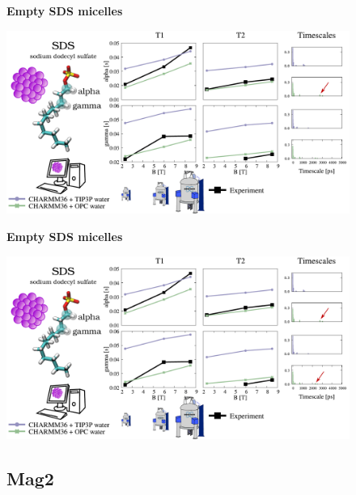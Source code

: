 \documentclass{beamer}
\begin{document}
\addtocounter{framenumber}{-1}
\begin{frame}
\begin{center}
\Large{\centering

\textbf{Empty SDS micelles} \\}

\vspace{0.5cm}


\includegraphics[height=6cm]{sds1.pdf}
\end{center}
\end{frame}


\addtocounter{framenumber}{-1}
\begin{frame}
\begin{center}
\Large{\centering

\textbf{Empty SDS micelles} \\}

\vspace{0.5cm}


\includegraphics[height=6cm]{sds0.pdf}
\end{center}
\end{frame}


\subsection{Mag2}
\end{document}
